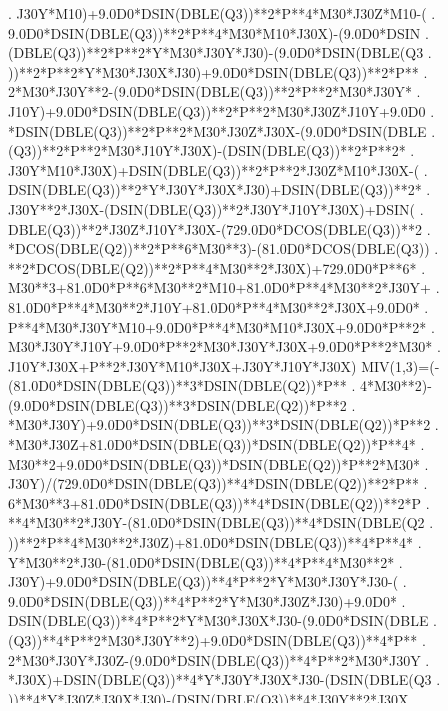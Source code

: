 \begin{framedverbatim}
     . J30Y*M10)+9.0D0*DSIN(DBLE(Q3))**2*P**4*M30*J30Z*M10-(
     . 9.0D0*DSIN(DBLE(Q3))**2*P**4*M30*M10*J30X)-(9.0D0*DSIN
     . (DBLE(Q3))**2*P**2*Y*M30*J30Y*J30)-(9.0D0*DSIN(DBLE(Q3
     . ))**2*P**2*Y*M30*J30X*J30)+9.0D0*DSIN(DBLE(Q3))**2*P**
     . 2*M30*J30Y**2-(9.0D0*DSIN(DBLE(Q3))**2*P**2*M30*J30Y*
     . J10Y)+9.0D0*DSIN(DBLE(Q3))**2*P**2*M30*J30Z*J10Y+9.0D0
     . *DSIN(DBLE(Q3))**2*P**2*M30*J30Z*J30X-(9.0D0*DSIN(DBLE
     . (Q3))**2*P**2*M30*J10Y*J30X)-(DSIN(DBLE(Q3))**2*P**2*
     . J30Y*M10*J30X)+DSIN(DBLE(Q3))**2*P**2*J30Z*M10*J30X-(
     . DSIN(DBLE(Q3))**2*Y*J30Y*J30X*J30)+DSIN(DBLE(Q3))**2*
     . J30Y**2*J30X-(DSIN(DBLE(Q3))**2*J30Y*J10Y*J30X)+DSIN(
     . DBLE(Q3))**2*J30Z*J10Y*J30X-(729.0D0*DCOS(DBLE(Q3))**2
     . *DCOS(DBLE(Q2))**2*P**6*M30**3)-(81.0D0*DCOS(DBLE(Q3))
     . **2*DCOS(DBLE(Q2))**2*P**4*M30**2*J30X)+729.0D0*P**6*
     . M30**3+81.0D0*P**6*M30**2*M10+81.0D0*P**4*M30**2*J30Y+
     . 81.0D0*P**4*M30**2*J10Y+81.0D0*P**4*M30**2*J30X+9.0D0*
     . P**4*M30*J30Y*M10+9.0D0*P**4*M30*M10*J30X+9.0D0*P**2*
     . M30*J30Y*J10Y+9.0D0*P**2*M30*J30Y*J30X+9.0D0*P**2*M30*
     . J10Y*J30X+P**2*J30Y*M10*J30X+J30Y*J10Y*J30X)
      MIV(1,3)=(-(81.0D0*DSIN(DBLE(Q3))**3*DSIN(DBLE(Q2))*P**
     . 4*M30**2)-(9.0D0*DSIN(DBLE(Q3))**3*DSIN(DBLE(Q2))*P**2
     . *M30*J30Y)+9.0D0*DSIN(DBLE(Q3))**3*DSIN(DBLE(Q2))*P**2
     . *M30*J30Z+81.0D0*DSIN(DBLE(Q3))*DSIN(DBLE(Q2))*P**4*
     . M30**2+9.0D0*DSIN(DBLE(Q3))*DSIN(DBLE(Q2))*P**2*M30*
     . J30Y)/(729.0D0*DSIN(DBLE(Q3))**4*DSIN(DBLE(Q2))**2*P**
     . 6*M30**3+81.0D0*DSIN(DBLE(Q3))**4*DSIN(DBLE(Q2))**2*P
     . **4*M30**2*J30Y-(81.0D0*DSIN(DBLE(Q3))**4*DSIN(DBLE(Q2
     . ))**2*P**4*M30**2*J30Z)+81.0D0*DSIN(DBLE(Q3))**4*P**4*
     . Y*M30**2*J30-(81.0D0*DSIN(DBLE(Q3))**4*P**4*M30**2*
     . J30Y)+9.0D0*DSIN(DBLE(Q3))**4*P**2*Y*M30*J30Y*J30-(
     . 9.0D0*DSIN(DBLE(Q3))**4*P**2*Y*M30*J30Z*J30)+9.0D0*
     . DSIN(DBLE(Q3))**4*P**2*Y*M30*J30X*J30-(9.0D0*DSIN(DBLE
     . (Q3))**4*P**2*M30*J30Y**2)+9.0D0*DSIN(DBLE(Q3))**4*P**
     . 2*M30*J30Y*J30Z-(9.0D0*DSIN(DBLE(Q3))**4*P**2*M30*J30Y
     . *J30X)+DSIN(DBLE(Q3))**4*Y*J30Y*J30X*J30-(DSIN(DBLE(Q3
     . ))**4*Y*J30Z*J30X*J30)-(DSIN(DBLE(Q3))**4*J30Y**2*J30X
     . )+DSIN(DBLE(Q3))**4*J30Y*J30Z*J30X-(729.0D0*DSIN(DBLE(
     . Q3))**2*DSIN(DBLE(Q2))**2*P**6*M30**3)-(81.0D0*DSIN(
     . DBLE(Q3))**2*DSIN(DBLE(Q2))**2*P**4*M30**2*J30Y)-(
     . 729.0D0*DSIN(DBLE(Q3))**2*P**6*M30**3)-(81.0D0*DSIN(
     . DBLE(Q3))**2*P**6*M30**2*M10)-(81.0D0*DSIN(DBLE(Q3))**
     . 2*P**4*Y*M30**2*J30)+81.0D0*DSIN(DBLE(Q3))**2*P**4*M30
     . **2*J30Z-(81.0D0*DSIN(DBLE(Q3))**2*P**4*M30**2*J10Y)-(

\end{framedverbatim}
